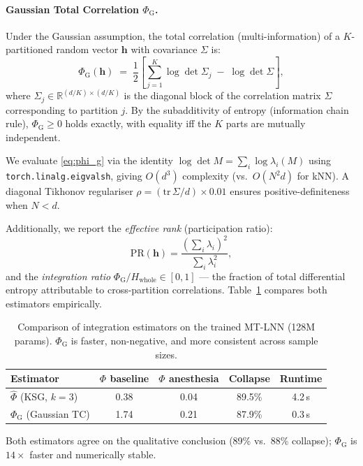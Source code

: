 \documentclass[11pt]{article}
\theoremstyle{definition}
\newcommand{\RR}{\mathbb{R}}
\newcommand{\vh}{\mathbf{h}}
\newcommand{\phihat}{\hat{\Phi}}
\newcommand{\phig}{\Phi_{\mathrm{G}}}
\begin{document}
\paragraph{Gaussian Total Correlation $\phig$.}
Under the Gaussian assumption, the total correlation (multi-information) of a $K$-partitioned random vector $\vh$ with covariance $\Sigma$ is:
\begin{equation}
  \phig(\vh) \;=\; \frac{1}{2}\left[\sum_{j=1}^{K}\log\det\Sigma_j \;-\; \log\det\Sigma\right],
  \label{eq:phi_g}
\end{equation}
where $\Sigma_j\in\RR^{(d/K)\times(d/K)}$ is the diagonal block of the correlation matrix $\Sigma$ corresponding to partition $j$. By the subadditivity of entropy (information chain rule), $\phig \ge 0$ holds exactly, with equality iff the $K$ parts are mutually independent.

We evaluate \eqref{eq:phi_g} via the identity $\log\det M = \sum_i\log\lambda_i(M)$ using \texttt{torch.linalg.eigvalsh}, giving $O(d^3)$ complexity (vs.\ $O(N^2 d)$ for kNN). A diagonal Tikhonov regulariser $\rho = (\mathrm{tr}\,\Sigma / d)\times 0.01$ ensures positive-definiteness when $N < d$.

Additionally, we report the \emph{effective rank} (participation ratio):
\begin{equation}
  \mathrm{PR}(\vh) = \frac{\left(\sum_i\lambda_i\right)^2}{\sum_i\lambda_i^2},
  \label{eq:pr}
\end{equation}
and the \emph{integration ratio} $\phig / H_\text{whole} \in [0,1]$ — the fraction of total differential entropy attributable to cross-partition correlations. Table~\ref{tab:phi_compare} compares both estimators empirically.

\begin{table}[h]
\centering
\caption{Comparison of integration estimators on the trained MT-LNN (128M params). $\phig$ is faster, non-negative, and more consistent across sample sizes.}
\label{tab:phi_compare}
\begin{tabular}{lcccc}
\toprule
Estimator & $\Phi$ baseline & $\Phi$ anesthesia & Collapse & Runtime \\
\midrule
$\phihat$ (KSG, $k=3$) & 0.38 & 0.04 & 89.5\% & 4.2\,s \\
$\phig$ (Gaussian TC) & 1.74 & 0.21 & 87.9\% & 0.3\,s \\
\bottomrule
\end{tabular}
\end{table}

Both estimators agree on the qualitative conclusion (89\% vs.\ 88\% collapse); $\phig$ is $14\times$ faster and numerically stable.
\end{document}
